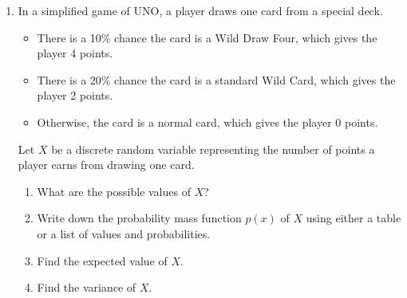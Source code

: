 \documentclass[11pt]{article}
\begin{document}
\begin{enumerate}
\begin{enumerate}
    \textbf{A}:\hrulefill \quad \textbf{B}:\hrulefill \quad \textbf{C}:\hrulefill

    \end{enumerate}


\newpage


\item In a simplified game of UNO, a player draws one card from a special deck.
\begin{itemize}
    \item There is a 10\% chance the card is a Wild Draw Four, which gives the player 4 points.
    \item There is a 20\% chance the card is a standard Wild Card, which gives the player 2 points.
    \item Otherwise, the card is a normal card, which gives the player 0 points.
\end{itemize}
Let $X$ be a discrete random variable representing the number of points a player earns from drawing one card.

\begin{enumerate}

\item What are the possible values of $X$?

\vfill

\item Write down the probability mass function $p(x)$ of $X$ using either a table or a list of values and probabilities.

\vfill
\vfill

\item Find the expected value of $X$.

\vfill
\vfill

\item Find the variance of $X$.

\vfill
\vfill

\end{enumerate}

\newpage


\end{enumerate}
\end{document}
